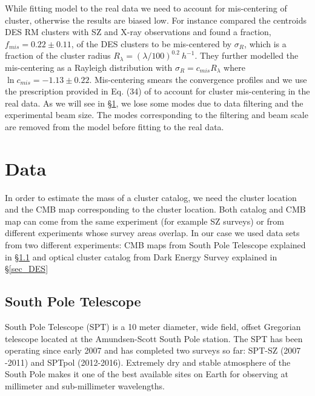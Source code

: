 
While fitting model to the real data we need to account for mis-centering of cluster, otherwise the results are biased low. 
For instance \citet{rykoff16} compared the centroids DES RM clusters with SZ \citep{bleem15} and X-ray observations and found a fraction, $f_{mis} = 0.22 \pm 0.11$, of the DES clusters to be mis-centered by $\sigma_{R}$, which is a fraction of the cluster radius $R_{\lambda} = (\lambda/100)^{0.2} \: h^{-1}$.
They further modelled the mis-centering as a Rayleigh distribution with $\sigma_{R} = c_{mis} R_{\lambda}$ where $\ln c_{mis} = -1.13 \pm 0.22$.
 Mis-centering smears the convergence profiles and we use the prescription provided in Eq. (34) of \citet{oguri11} to account for cluster mis-centering in the real data. %
As we will see in \S\ref{sec_data}, we lose some modes due to data filtering and the experimental beam size. The modes corresponding to the filtering and beam scale are removed from the model before fitting to the real data.
 
  
\section{Data}
\label{sec_data}
In order to estimate the mass of a cluster catalog, we need the cluster location and the CMB map corresponding to the cluster location.
 Both catalog and CMB map can come from the same experiment (for example SZ surveys) or from different experiments whose survey areas overlap.
In our case we used data sets from two different experiments: CMB maps from South Pole Telescope explained in \S\ref{sec_SPT} and 
optical cluster catalog from Dark Energy Survey explained in \S\ref{sec_DES}

\subsection{South Pole Telescope}
\label{sec_SPT}
South Pole Telescope (SPT) is a 10 meter diameter, wide field, offset Gregorian telescope \citep[SPT,][]{ carlstrom11,padin08} located at the Amundsen-Scott South Pole station.
The SPT has been operating since early 2007 and has completed two surveys so far: SPT-SZ (2007 -2011) and SPTpol (2012-2016).  
Extremely dry and stable atmosphere of the South Pole makes it one of the best available sites on Earth for observing at millimeter and sub-millimeter wavelengths. 

